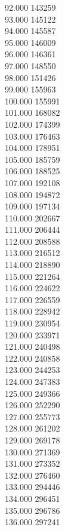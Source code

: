 { 92.000	143259 \\
 93.000	145122 \\
 94.000	145587 \\
 95.000	146009 \\
 96.000	146361 \\
 97.000	148550 \\
 98.000	151426 \\
 99.000	155963 \\
 100.000	155991 \\
 101.000	168082 \\
 102.000	174399 \\
 103.000	176463 \\
 104.000	178951 \\
 105.000	185759 \\
 106.000	188525 \\
 107.000	192108 \\
 108.000	194872 \\
 109.000	197134 \\
 110.000	202667 \\
 111.000	206444 \\
 112.000	208588 \\
 113.000	216512 \\
 114.000	218890 \\
 115.000	221264 \\
 116.000	224622 \\
 117.000	226559 \\
 118.000	228942 \\
 119.000	230954 \\
 120.000	233971 \\
 121.000	240498 \\
 122.000	240858 \\
 123.000	244253 \\
 124.000	247383 \\
 125.000	249366 \\
 126.000	252290 \\
 127.000	255773 \\
 128.000	261202 \\
 129.000	269178 \\
 130.000	271369 \\
 131.000	273352 \\
 132.000	276460 \\
 133.000	294446 \\
 134.000	296451 \\
 135.000	296786 \\
 136.000	297241 \\
}
